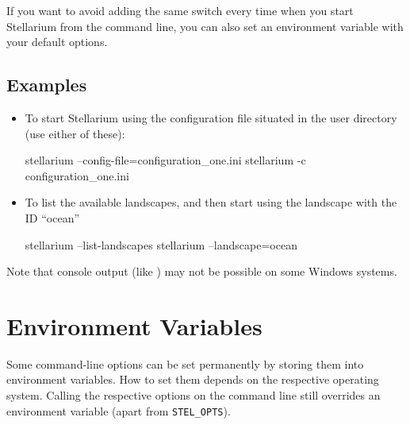 \noindent {} If you want to avoid adding the same
switch every time when you start Stellarium from the command line, you
can also set an environment variable  with your
default options. 

\subsection{Examples}
\label{sec:CommandLineOptions:Examples}

\begin{itemize}
\item To start Stellarium using the configuration file
   situated in the user directory (use either of
  these):

\begin{commands}
stellarium --config-file=configuration_one.ini
stellarium -c configuration_one.ini
\end{commands}

\item To list the available landscapes, and then start using the
  landscape with the ID ``ocean''
\begin{commands}
stellarium --list-landscapes 
stellarium --landscape=ocean
\end{commands}
\end{itemize}

\noindent Note that console output (like ) may not be possible on some Windows systems. 

%



\section{Environment Variables}
\label{sec:Environment}

Some command-line options can be set permanently by storing them into
environment variables. How to set them depends on the respective
operating system. Calling the respective options on the command line
still overrides an environment variable (apart from
\texttt{STEL\_OPTS}).

